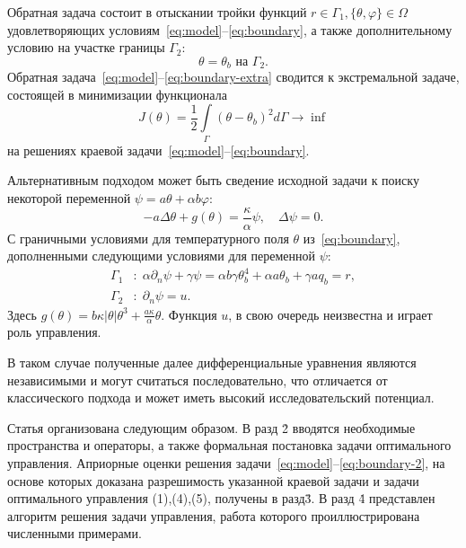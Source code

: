 Обратная задача состоит в отыскании тройки функций $r \in  \Gamma_1, \{\theta, \varphi\} \in \Omega $
удовлетворяющих условиям~\eqref{eq:model}--\eqref{eq:boundary}, а также дополнительному условию
на участке границы $\Gamma_2$:
\begin{equation}
    \label{eq:boundary-extra}
    \theta = \theta_b \text{ на } \Gamma_2.
\end{equation}
Обратная задача~\eqref{eq:model}--\eqref{eq:boundary-extra} сводится к экстремальной задаче,
состоящей в минимизации функционала
\begin{equation}
    \label{eq:cost}
    J(\theta) = \frac{1}{2}\int\limits_\Gamma (\theta - \theta_b)^{2} d\Gamma \rightarrow \inf
\end{equation}
на решениях краевой задачи~\eqref{eq:model}--\eqref{eq:boundary}.


Альтернативным подходом может быть сведение исходной задачи к поиску некоторой
переменной $\psi = a\theta + \alpha b \varphi$:
\begin{equation}
    \label{eq:equation}
    - a \Delta \theta + g (\theta) = \frac{\kappa}{\alpha}\psi, \quad
    \Delta \psi = 0.
\end{equation}
С граничными условиями для температурного поля $\theta$ из~\eqref{eq:boundary},
дополненными следующими условиями для переменной $\psi$:
\begin{equation}
    \label{eq:boundary-2}
    \begin{aligned}
        \Gamma_1 &: \; \alpha \partial_n \psi + \gamma \psi = \alpha b \gamma \theta_b^4
        + \alpha a \theta_b + \gamma a q_b = r, \\
        \Gamma_2 &: \; \partial_n \psi = u.
    \end{aligned}
\end{equation}
Здесь $g(\theta) = b \kappa|\theta|\theta^3 + \frac{a\kappa}{\alpha}\theta$.
Функция $u$, в свою очередь неизвестна и играет роль управления.

В таком случае полученные далее дифференциальные уравнения являются независимыми и
могут считаться последовательно,
что отличается от классического подхода и может иметь высокий исследовательский потенциал.

Статья организована следующим образом.
В разд \. 2 вводятся необходимые пространства и операторы,
а также формальная постановка задачи оптимального управления.
Априорные оценки решения задачи~\eqref{eq:model}--\eqref{eq:boundary-2}, на основе которых доказана разрешимость
указанной краевой задачи и задачи оптимального управления (1),(4),(5), получены в разд\. 3.
В разд \. 4 представлен алгоритм решения задачи управления, работа которого
проиллюстрирована численными примерами.
